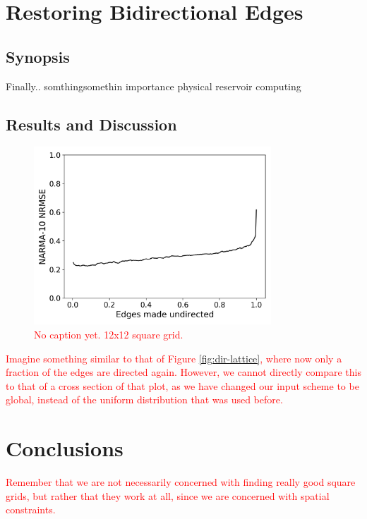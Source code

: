 \section{Restoring Bidirectional Edges}

\subsection{Synopsis}

Finally.. somthingsomethin importance physical reservoir computing

\subsection{Results and Discussion}

\begin{figure}
  \centering
  \includegraphics[width=3.5in]{figures/undir-performance.png}
  \caption{
    \textcolor{red}{
      No caption yet. 12x12 square grid.
    }
  }
  \label{fig:undirection-performance}
\end{figure}

\textcolor{red}{
  Imagine something similar to that of Figure \ref{fig:dir-lattice}, where now
only a fraction of the edges are directed again. However, we cannot directly
compare this to that of a cross section of that plot, as we have changed our
input scheme to be global, instead of the uniform distribution that was used
before.
}

\section{Conclusions}

\textcolor{red}{
  Remember that we are not necessarily concerned with finding really good square
grids, but rather that they work at all, since we are concerned with spatial
constraints.
}

